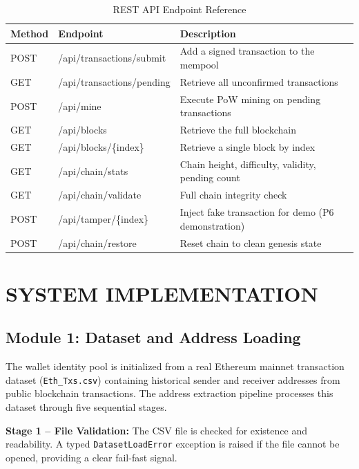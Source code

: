 \documentclass[12pt,a4paper]{report}
\begin{document}
\begin{table}[H]
\centering
\caption{REST API Endpoint Reference}
\label{tab:api}
\begin{tabular}{|l|l|p{6cm}|}
\hline
\textbf{Method} & \textbf{Endpoint} & \textbf{Description} \\
\hline
POST & /api/transactions/submit & Add a signed transaction to the mempool \\
\hline
GET  & /api/transactions/pending & Retrieve all unconfirmed transactions \\
\hline
POST & /api/mine & Execute PoW mining on pending transactions \\
\hline
GET  & /api/blocks & Retrieve the full blockchain \\
\hline
GET  & /api/blocks/\{index\} & Retrieve a single block by index \\
\hline
GET  & /api/chain/stats & Chain height, difficulty, validity, pending count \\
\hline
GET  & /api/chain/validate & Full chain integrity check \\
\hline
POST & /api/tamper/\{index\} & Inject fake transaction for demo (P6 demonstration) \\
\hline
POST & /api/chain/restore & Reset chain to clean genesis state \\
\hline
\end{tabular}
\end{table}

\chapter{SYSTEM IMPLEMENTATION}

\section{Module 1: Dataset and Address Loading}

The wallet identity pool is initialized from a real Ethereum mainnet transaction dataset
(\texttt{Eth\_Txs.csv}) containing historical sender and receiver addresses from public
blockchain transactions. The address extraction pipeline processes this dataset through
five sequential stages.

\textbf{Stage 1 -- File Validation:} The CSV file is checked for existence and readability.
A typed \texttt{DatasetLoadError} exception is raised if the file cannot be opened, providing
a clear fail-fast signal.
\end{document}
